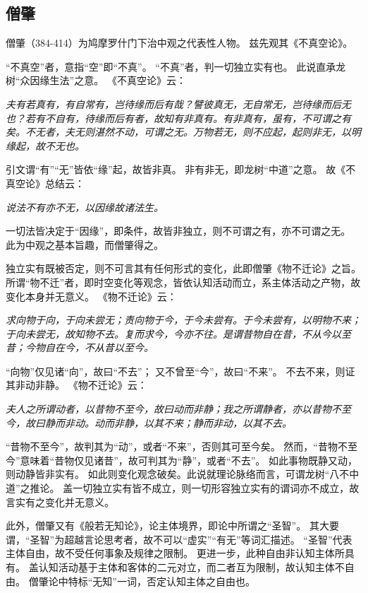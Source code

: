 \documentclass[11pt]{article}
\begin{document}
\subsection{僧肇}
僧肇（384-414）为鸠摩罗什门下治中观之代表性人物。
兹先观其《不真空论》。

\newline

“不真空”者，意指“空”即“不真”。
“不真”者，判一切独立实有也。
此说直承龙树“众因缘生法”之意。
《不真空论》云：

\textit{夫有若真有，有自常有，岂待缘而后有哉？譬彼真无，无自常无，岂待缘而后无也？若有不自有，待缘而后有者，故知有非真有。有非真有，虽有，不可谓之有矣。不无者，夫无则湛然不动，可谓之无。万物若无，则不应起，起则非无，以明缘起，故不无也。}

引文谓“有”“无”皆依“缘”起，故皆非真。
非有非无，即龙树“中道”之意。
故《不真空论》总结云：

\textit{说法不有亦不无，以因缘故诸法生。}

一切法皆决定于“因缘”，即条件，故皆非独立，则不可谓之有，亦不可谓之无。
此为中观之基本旨趣，而僧肇得之。

\newline

独立实有既被否定，则不可言其有任何形式的变化，此即僧肇《物不迁论》之旨。
所谓“物不迁”者，即时空变化等观念，皆依认知活动而立，系主体活动之产物，故变化本身并无意义。
《物不迁论》云：

\textit{求向物于向，于向未尝无；责向物于今，于今未尝有。于今未尝有，以明物不来；于向未尝无，故知物不去。复而求今，今亦不往。是谓昔物自在昔，不从今以至昔；今物自在今，不从昔以至今。}

“向物”仅见诸“向”，故曰“不去”；
又不曾至“今”，故曰“不来”。
不去不来，则证其非动非静。
《物不迁论》云：

\textit{夫人之所谓动者，以昔物不至今，故曰动而非静；我之所谓静者，亦以昔物不至今，故曰静而非动。动而非静，以其不来；静而非动，以其不去。}

“昔物不至今”，故判其为“动”，或者“不来”，否则其可至今矣。
然而，“昔物不至今”意味着“昔物仅见诸昔”，故可判其为“静”，或者“不去”。
如此事物既静又动，则动静皆非实有。
如此则变化观念破矣。此说就理论脉络而言，可谓龙树“八不中道”之推论。
盖一切独立实有皆不成立，则一切形容独立实有的谓词亦不成立，故言实有之变化并无意义。

\newline

此外，僧肇又有《般若无知论》，论主体境界，即论中所谓之“圣智”。
其大要谓，“圣智”为超越言论思考者，故不可以“虚实”“有无”等词汇描述。
“圣智”代表主体自由，故不受任何事象及规律之限制。
更进一步，此种自由非认知主体所具有。
盖认知活动基于主体和客体的二元对立，而二者互为限制，故认知主体不自由。
僧肇论中特标“无知”一词，否定认知主体之自由也。
\end{document}

